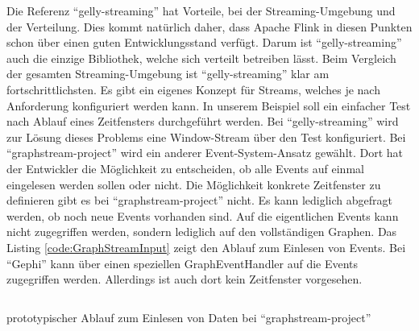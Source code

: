 Die Referenz \enquote{gelly-streaming} hat Vorteile, bei der Streaming-Umgebung
und der Verteilung. Dies kommt natürlich daher, dass Apache Flink in diesen
Punkten schon über einen guten Entwicklungsstand verfügt. Darum ist
\enquote{gelly-streaming} auch die einzige Bibliothek, welche sich verteilt
betreiben lässt. Beim Vergleich der gesamten Streaming-Umgebung ist
\enquote{gelly-streaming} klar am fortschrittlichsten. Es gibt ein eigenes
Konzept für Streams, welches je nach Anforderung konfiguriert werden kann. In
unserem Beispiel soll ein einfacher Test nach Ablauf eines Zeitfensters
durchgeführt werden. Bei \enquote{gelly-streaming} wird zur Lösung dieses
Problems eine Window-Stream über den Test konfiguriert. Bei \enquote{graphstream-project}
wird ein anderer Event-System-Ansatz gewählt. Dort hat der Entwickler die
Möglichkeit zu entscheiden, ob alle Events auf einmal eingelesen werden sollen
oder nicht. Die Möglichkeit konkrete Zeitfenster zu definieren gibt es bei
\enquote{graphstream-project} nicht. Es kann lediglich abgefragt werden, ob noch
neue Events vorhanden sind. Auf die eigentlichen Events kann nicht zugegriffen
werden, sondern lediglich auf den vollständigen Graphen. Das Listing
\ref{code:GraphStreamInput} zeigt den Ablauf zum Einlesen von Events. Bei \enquote{Gephi}
kann über einen speziellen GraphEventHandler auf die Events zugegriffen werden.
Allerdings ist auch dort kein Zeitfenster vorgesehen.

\begin{listing}
\inputminted[breaklines=true]{java}{../material/code/GraphStreamInput.java}
\caption{prototypischer Ablauf zum Einlesen von Daten bei \enquote{graphstream-project}}
\label{code:GraphStreamInput}
\end{listing}

